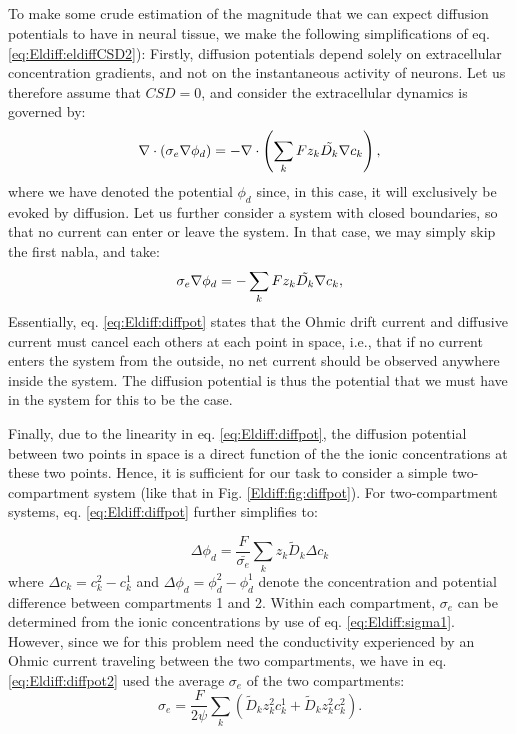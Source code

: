\subsection{}
To make some crude estimation of the magnitude that we can expect diffusion potentials to have in neural tissue, we make the following simplifications of eq. \ref{eq:Eldiff:eldiffCSD2}): Firstly, diffusion potentials depend solely on extracellular concentration gradients, and not on the instantaneous activity of neurons. Let us therefore assume that $CSD = 0$, and consider the extracellular dynamics is governed by:
\begin{equation}
\nabla \cdot (\sigma_e\nabla\phi_d) = - \nabla \cdot \left (\sum_k{F z_k \tilde{D_k}{\bf \nabla} c_{k}} \right), 
\label{eq:Eldiff:eldiffCSD3}
\end{equation}
where we have denoted the potential $\phi_d$ since, in this case, it will exclusively be evoked by diffusion. Let us further consider a system with closed boundaries, so that no current can enter or leave the system. In that case, we may simply skip the first nabla, and take:
\begin{equation}
\sigma_e\nabla\phi_d = -\sum_k{F z_k \tilde{D_k}{\bf \nabla} c_{k}}, 
\label{eq:Eldiff:diffpot}
\end{equation}
Essentially, eq. \ref{eq:Eldiff:diffpot} states that the Ohmic drift current and diffusive current must cancel each others at each point in space, i.e., that if no current enters the system from the outside, no net current should be observed anywhere inside the system. The diffusion potential is thus the potential that we must have in the system for this to be the case. 

Finally, due to the linearity in eq. \ref{eq:Eldiff:diffpot}, the diffusion potential between two points in space is a direct function of the the ionic concentrations at these two points. Hence, it is sufficient for our task to consider a simple two-compartment system (like that in Fig. \ref{Eldiff:fig:diffpot}). For two-compartment systems, eq. \ref{eq:Eldiff:diffpot} further simplifies to:

\begin{equation}
\Delta \phi_d = \frac{F}{\bar{\sigma_e}} \sum_k{z_k \tilde{D}_k \Delta c_k}
\label{eq:Eldiff:diffpot2}
\end{equation}
where $\Delta c_k = c_{k}^{2} - c_{k}^{1}$ and $\Delta \phi_d = \phi_d^{2} - \phi_d^{1}$ denote the concentration and potential difference between compartments 1 and 2. Within each compartment, $\sigma_e$ can be determined from the ionic concentrations by use of eq. \ref{eq:Eldiff:sigma1}. However, since we for this problem need the conductivity experienced by an Ohmic current traveling between the two compartments, we have in eq. \ref{eq:Eldiff:diffpot2} used the average $\sigma_e$ of the two compartments:
\begin{equation}
\sigma_e = \frac{F}{2\psi}\sum_{k} \left(\tilde{D}_k z_{k}^2 c_{k}^{1} + \tilde{D}_k z_{k}^2 c_{k}^{2} \right).
\label{eq:Eldiff:sigma2}
\end{equation}


